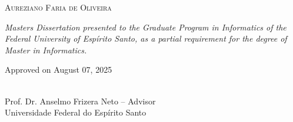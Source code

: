 \documentclass[
12pt, %
oneside, %
english, %
onehalfspacing,%
liststotoc, %
parskip, %
headsepline, %
]{MastersDoctoralThesis} %
\begin{document}
\newpage
\newpage

\newpage
\newpage

\begin{titlepage}
\begin{center}

\textsc{\normalsize Aureziano Faria de Oliveira}\\[0.1cm]

{\Large \bfseries \ttitle\par}\vspace{0.1cm} %
 
\textit{Masters Dissertation presented to the Graduate Program in Informatics of the Federal University of Esp\'{i}rito Santo, as a partial requirement for the degree of Master in Informatics.} 

\vspace{0.1cm}

\begin{minipage}[t]{0.4\textwidth}
\begin{flushleft} \normalsize
\end{flushleft}
\end{minipage}
\begin{minipage}[t]{0.4\textwidth}
\begin{flushright} \normalsize
Approved on August 07, 2025 \\
\end{flushright}
\end{minipage}

\vspace{0.3cm}

\begin{minipage}[t]{\textwidth}
\begin{center}

\normalsize 
\singlespace

\vspace{0.1cm}
\HRule \\
Prof. Dr. Anselmo Frizera Neto -- Advisor\\
Universidade Federal do Espírito Santo\\
\vspace{1.1cm}



\end{center}
\end{minipage}
\end{center}
\end{titlepage}
\end{document}

